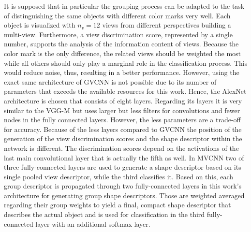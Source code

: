 It is supposed that in particular the grouping process can be adapted to the task of distinguishing the same objects with different color marks very well.
Each object is visualized with $n_v=12$ views from different perspectives building a multi-view.
Furthermore, a view discrimination score, represented by a single number, supports the analysis of the information content of views.
Because the color mark is the only difference, the related views should be weighted the most while all others should only play a marginal role in the classification process.
This would reduce noise, thus, resulting in a better performance.
However, using the exact same architecture of GVCNN is not possible due to its number of parameters that exceeds the available resources for this work.
Hence, the AlexNet architecture \cite{Krizhevsky:2012:ICD:2999134.2999257} is chosen that consists of eight layers.
Regarding its layers it is very similar to the VGG-M but uses larger but less filters for convolutions and fewer nodes in the fully connected layers.
However, the less parameters are a trade-off for accuracy.
Because of the less layers compared to GVCNN the position of the generation of the view discrimination scores and the shape descriptor within the network is different.
The discrimination scores depend on the activations of the last main convolutional layer that is actually the fifth as well.
In MVCNN two of three fully-connected layers are used to generate a shape descriptor based on its single pooled view descriptor, while the third classifies it.
Based on this, each group descriptor is propagated through two fully-connected layers in this work's architecture for generating group shape descriptors.
Those are weighted averaged regarding their group weights to yield a final, compact shape descriptor that describes the actual object and is used for classification in the third fully-connected layer with an additional softmax layer.

